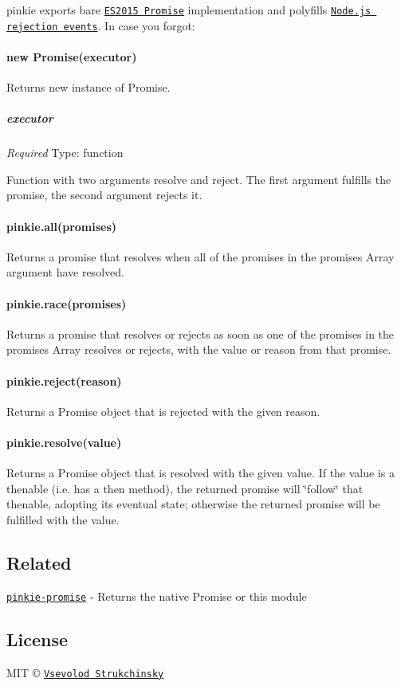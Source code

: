 {\ttfamily pinkie} exports bare \href{https://people.mozilla.org/~jorendorff/es6-draft.html#sec-promise-objects}{\tt E\+S2015 Promise} implementation and polyfills \href{https://nodejs.org/api/process.html#process_event_unhandledrejection}{\tt Node.\+js rejection events}. In case you forgot\+:

\paragraph*{new Promise(executor)}

Returns new instance of {\ttfamily Promise}.

\subparagraph*{executor}

{\itshape Required} Type\+: {\ttfamily function}

Function with two arguments {\ttfamily resolve} and {\ttfamily reject}. The first argument fulfills the promise, the second argument rejects it.

\paragraph*{pinkie.\+all(promises)}

Returns a promise that resolves when all of the promises in the {\ttfamily promises} Array argument have resolved.

\paragraph*{pinkie.\+race(promises)}

Returns a promise that resolves or rejects as soon as one of the promises in the {\ttfamily promises} Array resolves or rejects, with the value or reason from that promise.

\paragraph*{pinkie.\+reject(reason)}

Returns a Promise object that is rejected with the given {\ttfamily reason}.

\paragraph*{pinkie.\+resolve(value)}

Returns a Promise object that is resolved with the given {\ttfamily value}. If the {\ttfamily value} is a thenable (i.\+e. has a then method), the returned promise will \char`\"{}follow\char`\"{} that thenable, adopting its eventual state; otherwise the returned promise will be fulfilled with the {\ttfamily value}.

\subsection*{Related}


\begin{DoxyItemize}
\item \href{https://github.com/floatdrop/pinkie-promise}{\tt pinkie-\/promise} -\/ Returns the native Promise or this module
\end{DoxyItemize}

\subsection*{License}

M\+IT © \href{http://github.com/floatdrop}{\tt Vsevolod Strukchinsky} 